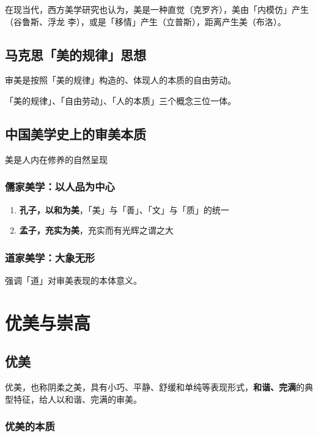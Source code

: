 \documentclass{NoteThesis/note-thesis}
\begin{document}
在现当代，西方美学研究也认为，美是一种直觉（克罗齐），美由「内模仿」产生（谷鲁斯、浮龙 李），或是「移情」产生（立普斯），距离产生美（布洛）。

\subsection{马克思「美的规律」思想}

审美是按照「美的规律」构造的、体现人的本质的自由劳动。

「美的规律」、「自由劳动」、「人的本质」三个概念三位一体。

\subsection{中国美学史上的审美本质}

美是人内在修养的自然呈现

\subsubsection*{儒家美学：以人品为中心}

\begin{enumerate}
    \item \textbf{孔子，以和为美}，「美」与「善」、「文」与「质」的统一
    \item \textbf{孟子，充实为美}，充实而有光辉之谓之大
\end{enumerate}

\subsubsection*{道家美学：大象无形}

强调「道」对审美表现的本体意义。

\section{\texorpdfstring{\mbox{}}{} 优美与崇高}

\subsection{优美}

优美，也称阴柔之美，具有小巧、平静、舒缓和单纯等表现形式，\textbf{和谐、完满}的典型特征，给人以和谐、完满的审美。

\subsubsection{优美的本质}
\end{document}

